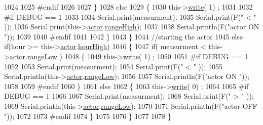 \begin{DoxyCode}
1024 
1025 \textcolor{preprocessor}{            #endif  }
1026 
1027             \}
1028             \textcolor{keywordflow}{else} 
1029             \{
1030                 this->\hyperlink{class_cool_board_actor_a958786ff01ea1056ee72c72d439f86da}{write}( 1) ;
1031 
1032 \textcolor{preprocessor}{            #if DEBUG == 1 }
1033 
1034                 Serial.print(measurment);
1035                 Serial.print(F(\textcolor{stringliteral}{" < "} ));
1036                 Serial.print(this->\hyperlink{class_cool_board_actor_a8f190db9f7a39fddbcef7f152da970e9}{actor}.\hyperlink{struct_cool_board_actor_1_1state_a6e5cd6c5cd44e2decfd8d4df1853f8e3}{rangeHigh});
1037 
1038                 Serial.println(F(\textcolor{stringliteral}{"actor ON "}));
1039 
1040 \textcolor{preprocessor}{            #endif  }
1041                 
1042             \}
1043     \}
1044     \textcolor{comment}{//starting the actor}
1045     \textcolor{keywordflow}{else} \textcolor{keywordflow}{if}(hour >= this->\hyperlink{class_cool_board_actor_a8f190db9f7a39fddbcef7f152da970e9}{actor}.\hyperlink{struct_cool_board_actor_1_1state_acd1af3ac2382258a5b05497d814adc01}{hourHigh})
1046     \{
1047             \textcolor{keywordflow}{if}( measurment < this->\hyperlink{class_cool_board_actor_a8f190db9f7a39fddbcef7f152da970e9}{actor}.\hyperlink{struct_cool_board_actor_1_1state_a43f891c9fb3bb63575c27cec860de55a}{rangeLow} )
1048             \{
1049                 this->\hyperlink{class_cool_board_actor_a958786ff01ea1056ee72c72d439f86da}{write}( 1) ;
1050 
1051 \textcolor{preprocessor}{            #if DEBUG == 1 }
1052 
1053                 Serial.print(measurment);
1054                 Serial.print(F(\textcolor{stringliteral}{" < "} ));
1055                 Serial.println(this->\hyperlink{class_cool_board_actor_a8f190db9f7a39fddbcef7f152da970e9}{actor}.\hyperlink{struct_cool_board_actor_1_1state_a43f891c9fb3bb63575c27cec860de55a}{rangeLow});
1056 
1057                 Serial.println(F(\textcolor{stringliteral}{"actor ON "}));
1058 
1059 \textcolor{preprocessor}{            #endif  }
1060             \}
1061             \textcolor{keywordflow}{else} 
1062             \{
1063                 this->\hyperlink{class_cool_board_actor_a958786ff01ea1056ee72c72d439f86da}{write}( 0) ;
1064 
1065 \textcolor{preprocessor}{            #if DEBUG == 1 }
1066 
1067                 Serial.print(measurment);
1068                 Serial.print(F(\textcolor{stringliteral}{" > "} ));
1069                 Serial.println(this->\hyperlink{class_cool_board_actor_a8f190db9f7a39fddbcef7f152da970e9}{actor}.\hyperlink{struct_cool_board_actor_1_1state_a43f891c9fb3bb63575c27cec860de55a}{rangeLow});
1070 
1071                 Serial.println(F(\textcolor{stringliteral}{"actor OFF "}));
1072 
1073 \textcolor{preprocessor}{            #endif                  }
1074             \}
1075 
1076     \}
1077 
1078 \}
\end{DoxyCode}
